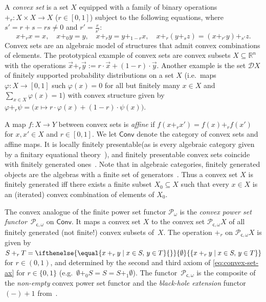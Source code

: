 \documentclass[10pt,a4paper]{article}
\theoremstyle{definition}
\theoremstyle{remark}
\numberwithin{equation}{section}
\providecommand{\catname}{\mathsf}
\def\Conv{\catname{Conv}}
\newcommand{\lfplong}{locally finitely presentable\xspace}
\newcommand{\lfp}{\lfplong}
\newcommand{\Pow}{\mathcal{P}}
\newcommand{\seq}{\subseteq}
\newcommand{\Dist}{\mathcal{D}}
\newcommand{\CPowf}{\Pow_{\mathsf{c},\omega}}
\newcommand{\set}[2][]{  \ifthenelse{\equal{#2}{}}{    \ensuremath{{#1\emptyset}}  }{    \ensuremath{{#1\{#2#1\}}}  }}
\theoremstyle{plain}
\theoremstyle{definition}
\begin{document}
A \emph{convex set} is a set \(X\) equipped with a family of binary operations \( +_{r}  \colon X \times X \rightarrow X\) (\(r \in [0, 1]\)) subject to the following equations, where \(s' = r + s -rs \ne 0\) and \(r' = \frac{r}{s'}\): 
  \begin{equation}\label{eq:convex-set-ax} x +_{r} x = x,
    \quad
    x +_{0} y = y,
    \quad
    x +_{r} y = y +_{1-r} x,
    \quad
    x +_{r} (y +_{s} z) = (x +_{r'} y ) +_{s'} z.
  \end{equation}
Convex sets are an algebraic model of structures that admit convex combinations of elements. The prototypical example of convex sets are convex subsets $X\subseteq \mathbb{R}^n$ with the operations $\vec x +_r \vec y := r\cdot \vec x
+ (1-r)\cdot \vec y$. Another example is the set $\Dist X$ of finitely supported probability distributions on a set $X$ (i.e.\ maps $\varphi\colon X\to [0,1]$ such $\varphi(x)=0$ for all but finitely many $x\in X$ and $\sum_{x\in X} \varphi(x) = 1$) with convex structure given by $\varphi+_r \psi = \big(x \mapsto r \cdot \varphi(x) + (1-r) \cdot \psi(x)\big)$.

 A map \(f \colon X \rightarrow Y\) between convex sets    is \emph{affine} if \(f(x +_{r} x') = f(x) +_{r} f(x')\) for \(x, x' \in X\) and \(r \in [0, 1]\). We let $\Conv$ denote the category of convex sets and affine maps. It is \lfp (as is every algebraic category given by a finitary equational theory~\cite{adamek_rosicky_1994}), and finitely presentable convex sets coincide with finitely generated ones~\cite[Cor.~5.5]{sw15}. Note that in algebraic categories, finitely generated objects are the algebras with a finite set of generators~\cite[Ex.~1.68]{adamek_rosicky_1994}. Thus a convex set $X$ is finitely generated iff there exists a finite subset $X_0\seq X$ such that every $x\in X$ is an (iterated) convex combination of elements of $X_0$. 

The convex analogue of the finite power set functor $\Pow_\omega$ is the \emph{convex power set functor}~$\CPowf$ on $\Conv$. It maps a convex set $X$ to the convex set $\CPowf X$ of all finitely generated (not finite!) convex subsets of~$X$. The operation $+_r$ on $\CPowf X$ is given by $S+_r T = \set{x+_r y \mid x\in S,\, y\in T}$ for $r\in (0,1)$, and determined by the second and third axiom of \eqref{eq:convex-set-ax} for $r\in \{0,1\}$ (e.g.\ $\emptyset +_0 S = S = S+_1 \emptyset$). The functor~$\CPowf$ is the composite of the \emph{non-empty} convex power set functor and the \emph{black-hole extension} functor $(-)+1$ from~\cite[Sec.~5]{bss17}.
\end{document}
